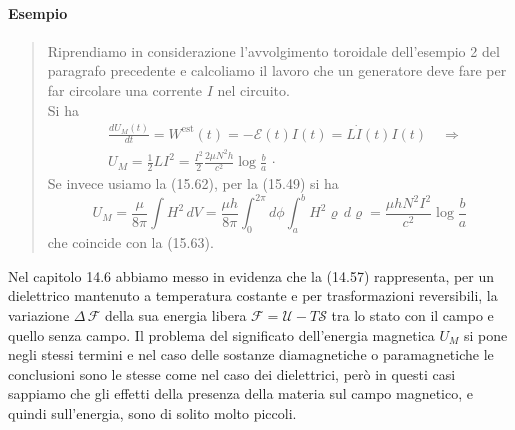 \paragraph{Esempio}
\begin{quote}
  Riprendiamo in considerazione l'avvolgimento toroidale dell'esempio 2 del
  paragrafo precedente e calcoliamo il lavoro che un generatore deve fare per
  far circolare una corrente $I$ nel circuito.\\
  Si ha
  \begin{equation}
    \begin{split}
      &\frac{dU_M(t)}{dt}=W^\mathrm{est}(t)=-\mathcal E(t)I(t)=L\dot I(t)I(t)
      \quad\Rightarrow\\
      &U_M=\frac12LI^2=\frac{I^2}{2}\frac{2\mu N^2h}{c^2}\log\frac ba\,\cdot
    \end{split}
    \tag{15.63}
  \end{equation}
  Se invece usiamo la (15.62), per la (15.49) si ha
  \[
    U_M=\frac{\mu}{8\pi}\int H^2\,dV
    =\frac{\mu h}{8\pi}\int_0^{2\pi}d\phi\int_a^bH^2\varrho\,d\varrho
    =\frac{\mu hN^2I^2}{c^2}\log\frac ba
  \]
  che coincide con la (15.63).
\end{quote}

Nel capitolo 14.6 abbiamo messo in evidenza che la (14.57) rappresenta, per un
dielettrico mantenuto a temperatura costante e per trasformazioni reversibili,
la variazione $\Delta\,\mathcal F$ della sua energia libera
$\mathcal F=\mathcal U-T\mathcal S$ tra lo stato con il campo e quello senza
campo. Il problema del significato dell'energia magnetica $U_M$ si pone negli
stessi termini e nel
caso delle sostanze diamagnetiche o paramagnetiche le conclusioni sono le stesse
come nel caso dei dielettrici, per\`o in questi casi sappiamo che gli effetti
della presenza della materia sul campo magnetico, e quindi sull'energia, sono di
solito molto piccoli.

